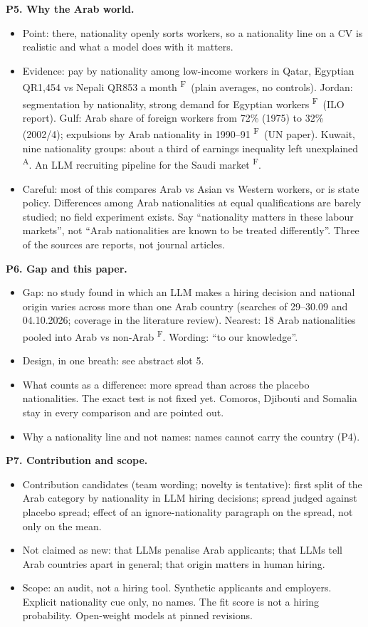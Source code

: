 \documentclass[11pt]{article}
\newcommand{\vF}{\textsuperscript{F}} %
\newcommand{\vA}{\textsuperscript{A}} %
\newcommand{\para}[1]{\smallskip\noindent\textbf{#1}}
\begin{document}
\para{P5. Why the Arab world.}
\begin{itemize}
\item Point: there, nationality openly sorts workers, so a nationality line on a CV is realistic and what a model does with it matters.
\item Evidence: pay by nationality among low-income workers in Qatar, Egyptian QR1,454 vs Nepali QR853 a month \citep{gardner2013portrait}\vF\ (plain averages, no controls). Jordan: segmentation by nationality, strong demand for Egyptian workers \citep{razzaz2017challenging}\vF\ (ILO report). Gulf: Arab share of foreign workers from 72\% (1975) to 32\% (2002/4); expulsions by Arab nationality in 1990--91 \citep{kapiszewski2006arab}\vF\ (UN paper). Kuwait, nine nationality groups: about a third of earnings inequality left unexplained \citep{alqudsi1991relative}\vA. An LLM recruiting pipeline for the Saudi market \citep{albaroudi2026addressing}\vF.
\item Careful: most of this compares Arab vs Asian vs Western workers, or is state policy. Differences among Arab nationalities at equal qualifications are barely studied; no field experiment exists. Say ``nationality matters in these labour markets'', not ``Arab nationalities are known to be treated differently''. Three of the sources are reports, not journal articles.
\end{itemize}

\para{P6. Gap and this paper.}
\begin{itemize}
\item Gap: no study found in which an LLM makes a hiring decision and national origin varies across more than one Arab country (searches of 29--30.09 and 04.10.2026; coverage in the literature review). Nearest: 18 Arab nationalities pooled into Arab vs non-Arab \citep{albaroudi2026addressing}\vF. Wording: ``to our knowledge''.
\item Design, in one breath: see abstract slot 5.
\item What counts as a difference: more spread than across the placebo nationalities. The exact test is not fixed yet. Comoros, Djibouti and Somalia stay in every comparison and are pointed out.
\item Why a nationality line and not names: names cannot carry the country (P4).
\end{itemize}

\para{P7. Contribution and scope.}
\begin{itemize}
\item Contribution candidates (team wording; novelty is tentative): first split of the Arab category by nationality in LLM hiring decisions; spread judged against placebo spread; effect of an ignore-nationality paragraph on the spread, not only on the mean.
\item Not claimed as new: that LLMs penalise Arab applicants; that LLMs tell Arab countries apart in general; that origin matters in human hiring.
\item Scope: an audit, not a hiring tool. Synthetic applicants and employers. Explicit nationality cue only, no names. The fit score is not a hiring probability. Open-weight models at pinned revisions.
\end{itemize}
\end{document}
